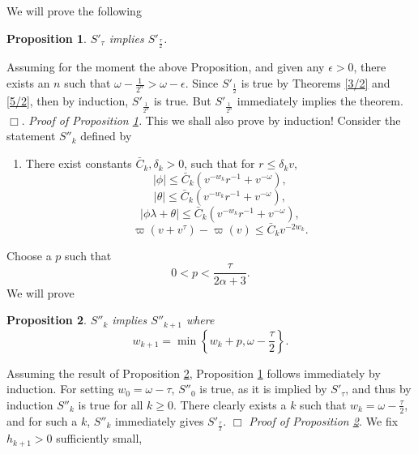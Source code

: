\documentclass{article}
\newtheorem{proposition}{Proposition}[section]
\begin{document}
We will prove the following
\begin{proposition}
\label{meto'}
$S'_\tau$ implies $S'_{\frac\tau2}$.
\end{proposition}

Assuming for the moment the above Proposition, and given any $\epsilon>0$, there
exists an $n$ such that $\omega-\frac1{2^n}>\omega-\epsilon$. Since $S'_\frac12$ is true by
Theorems \ref{3/2} and \ref{5/2}, then by 
induction, $S'_{\frac1{2^n}}$ is true. But $S'_{\frac1{2^n}}$ immediately implies
the theorem. $\Box$.
\vskip1pc
\noindent\emph{Proof of Proposition \ref{meto'}.}
This we shall also prove by induction!
Consider the statement $S''_k$ defined by
\begin{enumerate}
\item[$(S''_k)$]
There exist
constants $\bar{C}_k, \delta_k>0$, such that
for $r\le\delta_k v$,
\begin{equation}
\label{22y'''}
|\phi|\le \bar{C}_k\left(v^{-w_k}r^{-1}+v^{-\omega}\right),
\end{equation}
\begin{equation}
\label{33y'''}
|\theta|\le \bar{C}_k\left(v^{-w_k}r^{-1}+v^{-\omega}\right),
\end{equation}
\begin{equation}
\label{44y'''}
|\phi\lambda+\theta|\le \bar{C}_k\left(v^{-w_k}r^{-1}+v^{-\omega}\right),
\end{equation}
\begin{equation}
\label{11y'''}
\varpi(v+v^\tau)-\varpi(v)\le\bar{C}_kv^{-2w_k}.
\end{equation}
\end{enumerate}
Choose a $p$
such that
\begin{equation}
\label{pepilogn2}
0<p<\frac{\tau}{2\alpha+3}.
\end{equation}
We will prove
\begin{proposition}
\label{telprop;}
$S''_k$ implies $S''_{k+1}$
where 
\[
w_{k+1}=\min\left\{w_k+p, \omega-\frac\tau2\right\}.
\]
\end{proposition}
Assuming the result of Proposition \ref{telprop;}, Proposition \ref{meto'} follows
immediately by induction. For setting $w_0=\omega - \tau$, $S''_0$ is true, as it is implied by $S'_\tau$,
and thus by induction $S''_k$ is true for all $k\ge 0$. There clearly exists a $k$
such that $w_k=\omega-\frac\tau2$, and for such a $k$, $S''_k$ immediately gives $S'_{\frac\tau2}$.
$\Box$
\vskip1pc
\noindent\emph{Proof of Proposition \ref{telprop;}.}
We fix $h_{k+1}>0$ sufficiently small,
\end{document}
